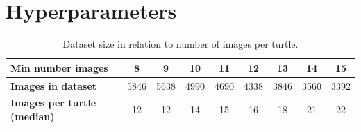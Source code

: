 \section{Hyperparameters}\label{apx:minImages}
\begin{table}[h!]
    \begin{tabular}{|l|c|c|c|c|c|c|c|c|}
    \hline
    \textbf{Min number images}                 & 8    & 9    & 10   & 11   & 12   & 13   & 14   & 15   \\ \hline
    \textbf{Images in dataset}               & 5846 & 5638 & 4990 & 4690 & 4338 & 3846 & 3560 & 3392 \\ \hline
    \textbf{Images per turtle (median)} & 12   & 12   & 14   & 15   & 16   & 18   & 21   & 22   \\ \hline
    \end{tabular}
    \caption[]{Dataset size in relation to number of images per turtle.}
    \label{tab:minImages}
\end{table}